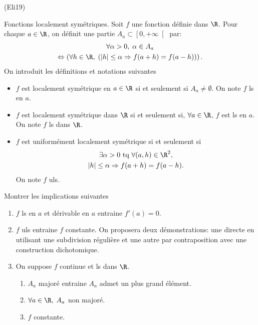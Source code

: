 \begin{tiny}(Eli19)\end{tiny} Fonctions localement symétriques.\newline
Soit $f$ une fonction définie dans $\R$. Pour chaque $a\in \R$, on définit une partie $A_a \subset \left[ 0, + \infty\right[$ par:
\begin{multline*}
  \forall \alpha >0, \;\alpha \in A_a \\
  \Leftrightarrow \left( \forall h \in \R, \;\left( |h| \leq \alpha \Rightarrow f(a+h) = f(a-h)\right) \right).
\end{multline*}
On introduit les définitions et notations suivantes
\begin{itemize}
  \item $f$ est localement symétrique en $a\in \R$ si et seulement si $A_a \neq \emptyset$. On note $f$ ls en $a$.
  \item $f$ est localement symétrique dans $\R$ si et seulement si, $\forall a\in \R$, $f$ est ls en $a$. On note $f$ ls dans $\R$.
  \item $f$ est uniformément localement symétrique si et seulement si
  \begin{multline*}
    \exists \alpha >0 \text{ tq } \forall (a,h) \in \R^2, \\ 
    |h| \leq \alpha \Rightarrow f(a+h) = f(a-h).
  \end{multline*}
  On note $f$ uls.
\end{itemize}
Montrer les implications suivantes
\begin{enumerate}
  \item $f$ ls en $a$ et dérivable en $a$ entraine $f'(a) = 0$.
  \item $f$ uls entraine $f$ constante. On proposera deux démonstrations: une directe en utilisant une subdivision régulière et une autre par contraposition avec une construction dichotomique.
  \item On suppose $f$ continue et ls dans $\R$.
  \begin{enumerate}
    \item $A_a$ majoré entraine $A_a$ admet un plus grand élément.
    \item $\forall a\in \R, \;A_a$ non majoré.
    \item $f$ constante.
  \end{enumerate}

\end{enumerate}
